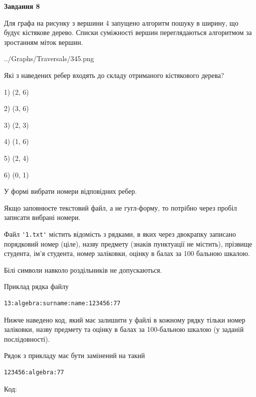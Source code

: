 \documentclass[12pt, ukrainian]{article}
\def\code#1{\Verb!#1!}
\begin{document}
{\begin {large}
{\begin {center}\textbf{Завдання 8}\end {center}}\par
Для графа на рисунку з вершини 4 запущено алгоритм пошуку в ширину, що будує кістякове дерево. Списки суміжності вершин переглядаються алгоритмом за зростанням міток вершин.\par
\begin{center}
	{../Graphs/Traversals/345.png}
\end{center}
\par Які з наведених ребер входять до складу отриманого кістякового дерева?\par
1) (2, 6)\par
2) (3, 6)\par
3) (2, 3)\par
4) (1, 6)\par
5) (2, 4)\par
6) (0, 1)\par
{\vskip 15pt} У формі вибрати номери відповідних ребер.


Якщо заповнюєте текстовий файл, а не гугл-форму, то потрібно через пробіл записа\-ти вибрані номери.\par
\newpage


Файл \code{'1.txt'} містить відомість з рядками, в яких через двокрапку записа\-но поряд\-ковий номер (ціле), назву предмету (знаків пунктуації не містить), прізвище студента, ім'я студента, номер заліковки, оцінку в балах за 100 бальною шкалою.

Білі символи навколо роздільників не допускаються.

Приклад рядка файлу



\begin{verbatim}
13:algebra:surname:name:123456:77
\end{verbatim}


Нижче наведено код, який має залишити у файлі в кожному рядку тільки номер заліковки, назву предмету та оцінку в балах за 100-бальною шкалою (у заданій послі\-дов\-ності).

Рядок з прикладу має бути замінений на такий



\begin{verbatim}
123456:algebra:77
\end{verbatim}




Код:




\end{large}}
\end{document}
